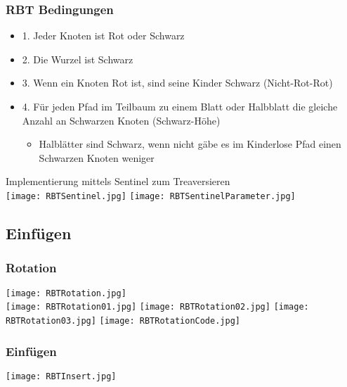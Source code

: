 		\subsubsection{RBT Bedingungen}
			\begin{minipage}[t]{0.5\textwidth}
				\begin{itemize}
					\item 1. Jeder Knoten ist Rot oder Schwarz
					\item 2. Die Wurzel ist Schwarz
					\item 3. Wenn ein Knoten Rot ist, sind seine Kinder Schwarz  (Nicht-Rot-Rot)
					\item 4. Für jeden Pfad im Teilbaum zu einem Blatt oder Halbblatt die gleiche Anzahl
						an Schwarzen Knoten (Schwarz-Höhe)
						\begin{itemize}
							\item Halblätter sind Schwarz, wenn nicht gäbe es im Kinderlose Pfad 
								einen Schwarzen Knoten weniger
						\end{itemize}
				\end{itemize}
			\end{minipage}
			\begin{minipage}[t]{0.45\textwidth}
				\begin{center}
					Implementierung mittels Sentinel zum Treaversieren \\
					\texttt{[image: RBTSentinel.jpg]}
					\texttt{[image: RBTSentinelParameter.jpg]}
				\end{center}
			\end{minipage}

	
	\vspace{2cm}
	\subsection{Einfügen}
		\subsubsection{Rotation}
			\begin{center}
				\texttt{[image: RBTRotation.jpg]} \\
				\texttt{[image: RBTRotation01.jpg]}
				\texttt{[image: RBTRotation02.jpg]}
				\texttt{[image: RBTRotation03.jpg]}
				\texttt{[image: RBTRotationCode.jpg]}
			\end{center}

		
		\subsubsection{Einfügen}
			\begin{center}
				\texttt{[image: RBTInsert.jpg]}
			\end{center}

